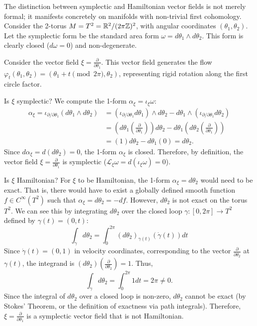 \begin{example}
\label{ex:t2_symp_non_ham2}
The distinction between symplectic and Hamiltonian vector fields is not merely formal; it manifests concretely on manifolds with non-trivial first cohomology. Consider the 2-torus $M = T^2 = \mathbb{R}^2 / (2\pi\mathbb{Z})^2$, with angular coordinates $(\theta_1, \theta_2)$. Let the symplectic form be the standard area form $\omega = d\theta_1 \wedge d\theta_2$. This form is clearly closed ($d\omega = 0$) and non-degenerate.

Consider the vector field $\xi = \frac{\partial}{\partial\theta_1}$. This vector field generates the flow $\varphi_t(\theta_1, \theta_2) = (\theta_1 + t \pmod{2\pi}, \theta_2)$, representing rigid rotation along the first circle factor.

Is $\xi$ symplectic? We compute the 1-form $\alpha_\xi = \iota_\xi \omega$:
\begin{align*} \alpha_\xi = \iota_{\partial/\partial\theta_1} (d\theta_1 \wedge d\theta_2) &= (\iota_{\partial/\partial\theta_1} d\theta_1) \wedge d\theta_2 - d\theta_1 \wedge (\iota_{\partial/\partial\theta_1} d\theta_2) \\ &= (d\theta_1(\tfrac{\partial}{\partial\theta_1})) d\theta_2 - d\theta_1 (d\theta_2(\tfrac{\partial}{\partial\theta_1})) \\ &= (1) d\theta_2 - d\theta_1 (0) = d\theta_2. \end{align*}
Since $d\alpha_\xi = d(d\theta_2) = 0$, the 1-form $\alpha_\xi$ is closed. Therefore, by definition, the vector field $\xi = \frac{\partial}{\partial\theta_1}$ is symplectic ($\mathcal{L}_\xi \omega = d(\iota_\xi \omega) = 0$).

Is $\xi$ Hamiltonian? For $\xi$ to be Hamiltonian, the 1-form $\alpha_\xi = d\theta_2$ would need to be exact. That is, there would have to exist a globally defined smooth function $f \in C^\infty(T^2)$ such that $\alpha_\xi = d\theta_2 = -df$. However, $d\theta_2$ is not exact on the torus $T^2$. We can see this by integrating $d\theta_2$ over the closed loop $\gamma: [0, 2\pi] \to T^2$ defined by $\gamma(t) = (0, t)$:
\[ \int_\gamma d\theta_2 = \int_0^{2\pi} (d\theta_2)_{\gamma(t)}(\dot{\gamma}(t)) dt \]
Since $\dot{\gamma}(t) = (0, 1)$ in velocity coordinates, corresponding to the vector $\frac{\partial}{\partial\theta_2}$ at $\gamma(t)$, the integrand is $(d\theta_2)(\frac{\partial}{\partial\theta_2}) = 1$. Thus,
\[ \int_\gamma d\theta_2 = \int_0^{2\pi} 1 dt = 2\pi \neq 0. \]
Since the integral of $d\theta_2$ over a closed loop is non-zero, $d\theta_2$ cannot be exact (by Stokes' Theorem, or the definition of exactness via path integrals). Therefore, $\xi = \frac{\partial}{\partial\theta_1}$ is a symplectic vector field that is not Hamiltonian.


\end{example}
